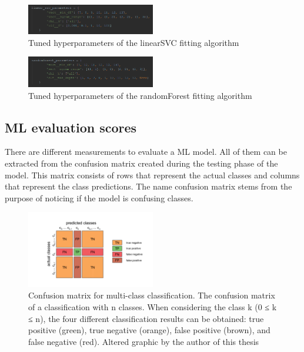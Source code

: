 \begin{figure}[h]
      \centering
      \includegraphics[width=0.5\textwidth]{img/linearSVC_hyperparameters}
      \caption{Tuned hyperparameters of the linearSVC fitting algorithm}
      \label{fig:linearSVC_hyperparameters}
\end{figure}
\begin{figure}[h]
     \centering
       \includegraphics[width=0.5\textwidth]{img/randomForest_hyperparameters}
       \caption{Tuned hyperparameters of the randomForest fitting algorithm}
       \label{fig:randomForest_hyperparameters}
    \end{figure}


\subsection{ML evaluation scores} \label{ml_evaluation_scores}
There are different measurements to evaluate a ML model. All of them can be extracted from the confusion matrix created during the testing phase of the model. This matrix consists of rows that represent the actual classes and columns that represent the class predictions. The name confusion matrix stems from the purpose of noticing if the model is confusing classes.
\begin{figure}[h]
       \centering
       \includegraphics[width=0.5\textwidth, left]{img/Confusion_matrix_edited}
       \caption{Confusion matrix for multi-class classification. The confusion matrix of a classification with n classes. When considering the class k (0 ≤ k ≤ n), the four different classification results can be obtained: true positive (green), true negative (orange), false positive (brown), and false negative (red). Altered graphic by the author of this thesis \parencite{Kruger2018ActivityModels}}
       \label{fig:confusion_matrix_illustration}
\end{figure}
    
